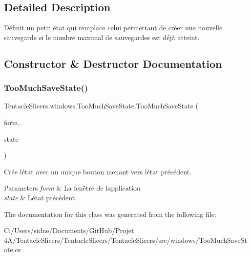 \subsection{Detailed Description}
Définit un petit état qui remplace celui permettant de créer une nouvelle sauvegarde si le nombre maximal de sauvegardes est déjà atteint. 



\subsection{Constructor \& Destructor Documentation}
\mbox{\label{class_tentacle_slicers_1_1windows_1_1_too_much_save_state_a9ebf16aeac5e087876440459e4715dfb}} 
\subsubsection{\texorpdfstring{Too\+Much\+Save\+State()}{TooMuchSaveState()}}
{\footnotesize\ttfamily Tentacle\+Slicers.\+windows.\+Too\+Much\+Save\+State.\+Too\+Much\+Save\+State (\begin{DoxyParamCaption}\item[{\hyperlink{class_tentacle_slicers_1_1windows_1_1_main_form}{Main\+Form}}]{form,  }\item[{\hyperlink{class_tentacle_slicers_1_1windows_1_1_windows_state}{Windows\+State}}]{state }\end{DoxyParamCaption})}



Crée l\textquotesingle{}état avec un unique bouton menant vers l\textquotesingle{}état précédent. 


\begin{DoxyParams}{Parameters}
{\em form} & La fenêtre de l\textquotesingle{}application \\
\hline
{\em state} & L\textquotesingle{}état précédent \\
\hline
\end{DoxyParams}


The documentation for this class was generated from the following file\+:\begin{DoxyCompactItemize}
\item 
C\+:/\+Users/sidne/\+Documents/\+Git\+Hub/\+Projet 4\+A/\+Tentacle\+Slicers/\+Tentacle\+Slicers/\+Tentacle\+Slicers/src/windows/Too\+Much\+Save\+State.\+cs\end{DoxyCompactItemize}

